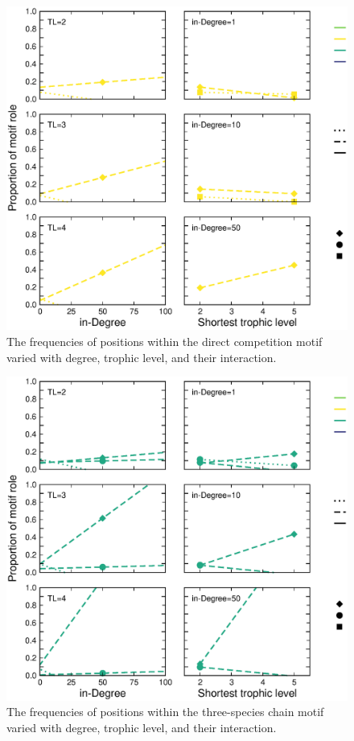 \documentclass[12pt]{article}
\begin{document}
\begin{spacing}{2.0}
            \begin{figure}[h!]
                \centering
                \includegraphics[width=.75\textwidth]{figures/positions_byTL_Directcompetition.eps}
                \caption{The frequencies of positions within the direct competition motif varied with degree, trophic level, and their interaction.}
                \label{dircomp_DT}
            \end{figure}
    
    
            \begin{figure}[h!]
                \centering
                \includegraphics[width=.75\textwidth]{figures/positions_byTL_Three-specieschain.eps}
                \caption{The frequencies of positions within the three-species chain motif varied with degree, trophic level, and their interaction.}
                \label{chain_DT}
            \end{figure}
    

\end{spacing}
\end{document}
